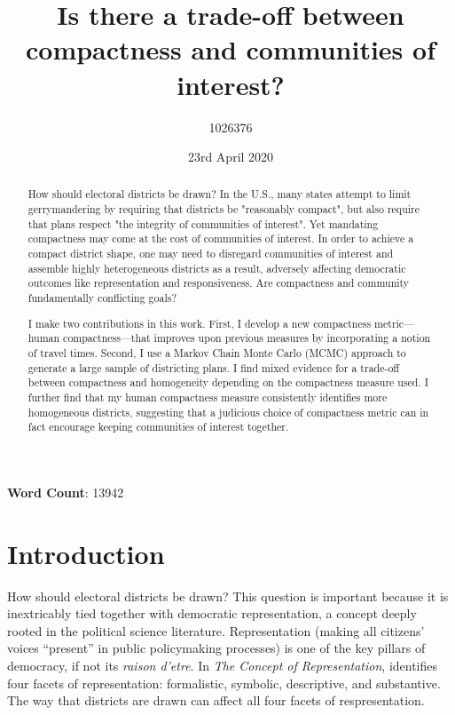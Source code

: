 \documentclass[]{article}
\title{Is there a trade-off between compactness and communities of interest?}
\author{1026376}
\date{23rd April 2020}
\begin{document}
\maketitle

\def\citeapos#1{\citeauthor{#1}'s (\citeyear{#1})}

\begin{abstract}
How should electoral districts be drawn? In the U.S.,
many states attempt to limit gerrymandering by requiring that districts be
"reasonably compact", but also require that plans respect "the integrity of
communities of interest". Yet mandating compactness may come at the cost
of communities of interest. In order to achieve a compact district shape, one
may need to disregard communities of interest and assemble highly heterogeneous
districts as a result, adversely affecting democratic outcomes like
representation and responsiveness. Are compactness and community fundamentally
conflicting goals?

I make two contributions in this work. First, I develop a new compactness
metric---human compactness---that improves upon previous measures by
incorporating a notion of travel times. Second, I use a Markov Chain Monte
Carlo (MCMC) approach to generate a large sample of districting plans. I find
mixed evidence for a trade-off between compactness and homogeneity depending on
the compactness measure used. I further find that my human compactness measure
consistently identifies more homogeneous districts, suggesting that a judicious
choice of compactness metric can in fact encourage keeping communities of
interest together.

\end{abstract}

\begin{center}
\textbf{Word Count}: 13942
\end{center}

\pagebreak{}

\tableofcontents{}

\pagebreak{}

\hypertarget{introduction}{%
\section{Introduction}\label{introduction}}

How should electoral districts be drawn? This question is important
because it is inextricably tied together with democratic representation,
a concept deeply rooted in the political science literature.
Representation (making all citizens' voices ``present'' in public
policymaking processes) is one of the key pillars of democracy, if not
its \emph{raison d'etre}. In \emph{The Concept of Representation},
\cite{pitkin} identifies four facets of representation: formalistic,
symbolic, descriptive, and substantive. The way that districts are drawn
can affect all four facets of respresentation.
\end{document}
